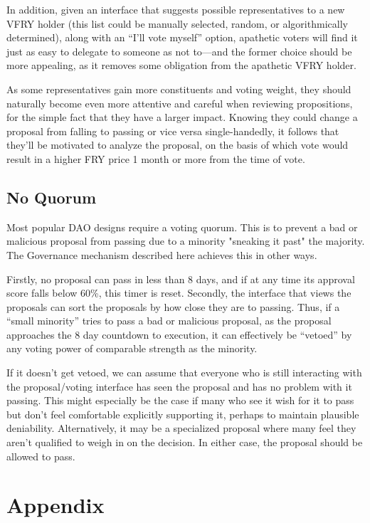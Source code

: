 In addition, given an interface that suggests possible representatives to a new VFRY holder (this list could be manually selected, random, or algorithmically determined), along with an ``I'll vote myself'' option, apathetic voters will find it just as easy to delegate to someone as not to---and the former choice should be more appealing, as it removes some obligation from the apathetic VFRY holder.

As some representatives gain more constituents and voting weight, they should naturally become even more attentive and careful when reviewing propositions, for the simple fact that they have a larger impact. Knowing they could change a proposal from falling to passing or vice versa single-handedly, it follows that they'll be motivated to analyze the proposal, on the basis of which vote would result in a higher FRY price 1 month or more from the time of vote.

\subsection{No Quorum}

Most popular DAO designs require a voting quorum. This is to prevent a bad or malicious proposal from passing due to a minority "sneaking it past" the majority. The Governance mechanism described here achieves this in other ways.

Firstly, no proposal can pass in less than 8 days, and if at any time its approval score falls below 60\%, this timer is reset. Secondly, the interface that views the proposals can sort the proposals by how close they are to passing. Thus, if a ``small minority'' tries to pass a bad or malicious proposal, as the proposal approaches the 8 day countdown to execution, it can effectively be ``vetoed'' by any voting power of comparable strength as the minority.

If it doesn't get vetoed, we can assume that everyone who is still interacting with the proposal/voting interface has seen the proposal and has no problem with it passing. This might especially be the case if many who see it wish for it to pass but don't feel comfortable explicitly supporting it, perhaps to maintain plausible deniability. Alternatively, it may be a specialized proposal where many feel they aren't qualified to weigh in on the decision. In either case, the proposal should be allowed to pass.

\section{Appendix} \label{appendix}

